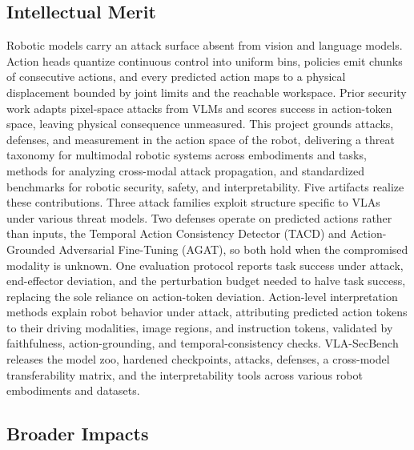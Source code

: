 \subsection*{Intellectual Merit}
Robotic models carry an attack surface absent from vision and language models. Action heads {quantize continuous control into uniform bins}, policies emit chunks of consecutive actions, and every predicted action maps to a physical displacement bounded by joint limits and the reachable workspace. Prior security work adapts pixel-space attacks from VLMs and scores success in action-token space, leaving physical consequence unmeasured. 
This project grounds attacks, defenses, and measurement in the action space of the robot, delivering  a threat taxonomy for multimodal robotic systems across embodiments and tasks,  methods for analyzing cross-modal attack propagation, and  standardized benchmarks for robotic security, safety, and interpretability. Five artifacts realize these contributions.
 Three attack families exploit structure specific to VLAs under various threat models. 
 Two defenses operate on predicted actions rather than inputs, the Temporal Action Consistency Detector (TACD) and Action-Grounded Adversarial Fine-Tuning (AGAT), so both hold when the compromised modality is unknown. 
 One evaluation protocol reports task success under attack, end-effector deviation, and the perturbation budget needed to halve task success, replacing the sole reliance on action-token deviation.
 Action-level interpretation methods explain robot behavior under attack, attributing predicted action tokens to their driving modalities, image regions, and instruction tokens, validated by faithfulness, action-grounding, and temporal-consistency checks.
 VLA-SecBench releases the model zoo, hardened checkpoints, attacks, defenses, a cross-model transferability matrix, and the interpretability tools across various robot embodiments and datasets.




\subsection*{Broader Impacts}

